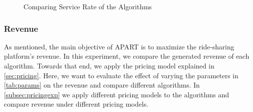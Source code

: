 \begin{figure}[h]
    \centering
    \vspace{-0.15in}
    \caption{Comparing Service Rate of the Algorithms}
    \label{fig:sr}
\end{figure}

\vspace{-1mm}
\subsubsection{Revenue}
As mentioned, the main objective of APART is to maximize the ride-sharing platform's revenue. In this experiment, we compare the generated revenue of each algorithm. Towards that end, we apply the pricing model explained in \cref{sec:pricing}. Here, we want to evaluate the effect of varying the parameters in \cref{tab:params} on the revenue and compare different algorithms. In \cref{subsec:pricingexp} we apply different pricing models to the algorithms and compare revenue under different pricing models.

